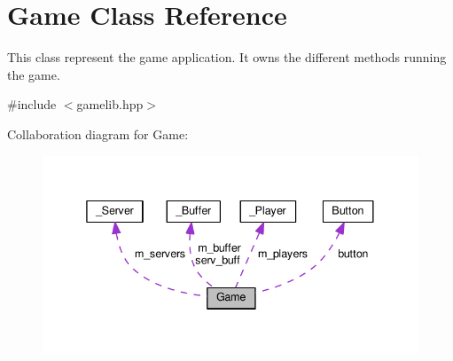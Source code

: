 \hypertarget{class_game}{}\section{Game Class Reference}
\label{class_game}


This class represent the game application. It owns the different methods running the game.  




{\ttfamily \#include $<$gamelib.\+hpp$>$}



Collaboration diagram for Game\+:\nopagebreak
\begin{figure}[H]
\begin{center}
\leavevmode
\includegraphics[width=338pt]{class_game__coll__graph}
\end{center}
\end{figure}
